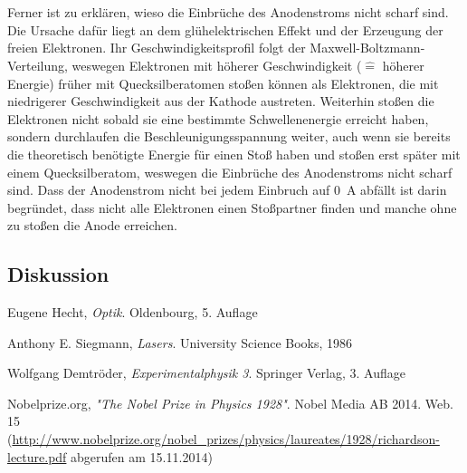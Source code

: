 \documentclass[11pt, a4paper]{article}
\begin{document}
\\
\\
Ferner ist zu erklären, wieso die Einbrüche des Anodenstroms nicht scharf sind.
Die Ursache dafür liegt an dem glühelektrischen Effekt und der Erzeugung der freien Elektronen.
Ihr Geschwindigkeitsprofil folgt der Maxwell-Boltzmann-Verteilung, weswegen Elektronen mit höherer Geschwindigkeit ($\widehat{=}$ höherer Energie) früher mit Quecksilberatomen stoßen können als Elektronen, die mit niedrigerer Geschwindigkeit aus der Kathode austreten.
Weiterhin stoßen die Elektronen nicht sobald sie eine bestimmte Schwellenenergie erreicht haben, sondern durchlaufen die Beschleunigungsspannung weiter, auch wenn sie bereits die theoretisch benötigte Energie für einen Stoß haben und stoßen erst später mit einem Quecksilberatom, weswegen die Einbrüche des Anodenstroms nicht scharf sind.
Dass der Anodenstrom nicht bei jedem Einbruch auf \SI{0}{\ampere} abfällt ist darin begründet, dass nicht alle Elektronen einen Stoßpartner finden und manche ohne zu stoßen die Anode erreichen. 

\subsection{Diskussion}

\FloatBarrier


\begin{thebibliography}{9}

	Eugene Hecht,
	\emph{Optik}.
	Oldenbourg,
	5. Auflage
	
	Anthony E. Siegmann,
	\emph{Lasers}.
	University Science Books,
	1986
	
	Wolfgang Demtröder,
	\emph{Experimentalphysik 3}.
	Springer Verlag,
	3. Auflage

 Nobelprize.org,
 \emph{"The Nobel Prize in Physics 1928"}.
 Nobel Media AB 2014. Web. 15\\
 (\url{http://www.nobelprize.org/nobel_prizes/physics/laureates/1928/richardson-lecture.pdf} abgerufen am 15.11.2014)
\end{thebibliography}
\end{document}
